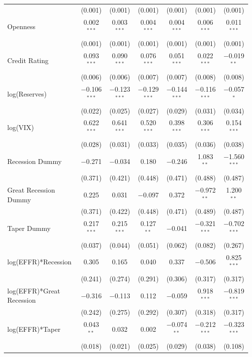 \documentclass[12pt]{article}
\begin{document}
\begin{table}[!h]
\begin{tabular}{@{\extracolsep{5pt}}lcccccc}
  & (0.001) & (0.001) & (0.001) & (0.001) & (0.001) & (0.001) \\ 
  Openness & 0.002$^{***}$ & 0.003$^{***}$ & 0.004$^{***}$ & 0.004$^{***}$ & 0.006$^{***}$ & 0.011$^{***}$ \\ 
  & (0.001) & (0.001) & (0.001) & (0.001) & (0.001) & (0.001) \\ 
  Credit Rating & 0.093$^{***}$ & 0.090$^{***}$ & 0.076$^{***}$ & 0.051$^{***}$ & 0.022$^{***}$ & $-$0.019$^{**}$ \\ 
  & (0.006) & (0.006) & (0.007) & (0.007) & (0.008) & (0.008) \\ 
  log(Reserves) & $-$0.106$^{***}$ & $-$0.123$^{***}$ & $-$0.129$^{***}$ & $-$0.144$^{***}$ & $-$0.116$^{***}$ & $-$0.057$^{*}$ \\ 
  & (0.022) & (0.025) & (0.027) & (0.029) & (0.031) & (0.034) \\ 
  log(VIX) & 0.622$^{***}$ & 0.641$^{***}$ & 0.520$^{***}$ & 0.398$^{***}$ & 0.306$^{***}$ & 0.154$^{***}$ \\ 
  & (0.028) & (0.031) & (0.033) & (0.035) & (0.036) & (0.038) \\ 
  Recession Dummy & $-$0.271 & $-$0.034 & 0.180 & $-$0.246 & 1.083$^{**}$ & $-$1.560$^{***}$ \\ 
  & (0.371) & (0.421) & (0.448) & (0.471) & (0.488) & (0.487) \\ 
  Great Recession Dummy & 0.225 & 0.031 & $-$0.097 & 0.372 & $-$0.972$^{**}$ & 1.200$^{**}$ \\ 
  & (0.371) & (0.422) & (0.448) & (0.471) & (0.489) & (0.487) \\ 
  Taper Dummy & 0.217$^{***}$ & 0.215$^{***}$ & 0.127$^{**}$ & $-$0.041 & $-$0.321$^{***}$ & $-$0.702$^{***}$ \\ 
  & (0.037) & (0.044) & (0.051) & (0.062) & (0.082) & (0.267) \\ 
  log(EFFR)*Recession & 0.305 & 0.165 & 0.040 & 0.337 & $-$0.506 & 0.825$^{***}$ \\ 
  & (0.241) & (0.274) & (0.291) & (0.306) & (0.317) & (0.317) \\ 
  log(EFFR)*Great Recession & $-$0.316 & $-$0.113 & 0.112 & $-$0.059 & 0.918$^{***}$ & $-$0.819$^{***}$ \\ 
  & (0.242) & (0.275) & (0.292) & (0.307) & (0.318) & (0.317) \\ 
  log(EFFR)*Taper & 0.043$^{**}$ & 0.032 & 0.002 & $-$0.074$^{**}$ & $-$0.212$^{***}$ & $-$0.323$^{***}$ \\ 
  & (0.018) & (0.021) & (0.025) & (0.029) & (0.038) & (0.108) \\ 

\end{tabular}
\end{table}
\end{document}
